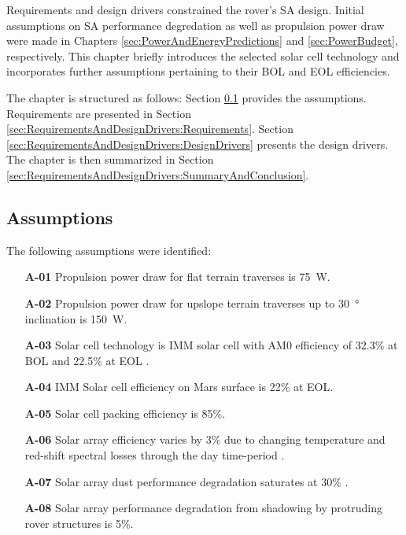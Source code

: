 Requirements and design drivers constrained the rover's \ac{SA} design. Initial assumptions on \ac{SA} performance degredation as well as propulsion power draw were made in Chapters \ref{sec:PowerAndEnergyPredictions} and \ref{sec:PowerBudget}, respectively. This chapter briefly introduces the selected solar cell technology and incorporates further assumptions pertaining to their \ac{BOL} and \ac{EOL} efficiencies.

The chapter is structured as follows: Section \ref{sec:RequirementsAndDesignDrivers:Assumptions} provides the assumptions. Requirements are presented in Section \ref{sec:RequirementsAndDesignDrivers:Requirements}. Section  \ref{sec:RequirementsAndDesignDrivers:DesignDrivers} presents the design drivers. The chapter is then summarized in Section \ref{sec:RequirementsAndDesignDrivers:SummaryAndConclusion}.


\subsection{Assumptions}
\label{sec:RequirementsAndDesignDrivers:Assumptions}
The following assumptions were identified:

\begin{itemize}
    \item[\textbf{A-01}] Propulsion power draw for flat terrain traverses is \SI{75}{\watt}.
    \item[\textbf{A-02}] Propulsion power draw for upslope terrain traverses up to \SI{30}{\degree} inclination is \SI{150}{\watt}.
    \item[\textbf{A-03}] Solar cell technology is \ac{IMM} solar cell with AM0 efficiency of 32.3\% at \ac{BOL} and 22.5\% at \ac{EOL} .
    \item[\textbf{A-04}] IMM Solar cell efficiency on Mars surface is 22\% at \ac{EOL}.
    \item[\textbf{A-05}] Solar cell packing efficiency is 85\%.
    \item[\textbf{A-06}] Solar array efficiency varies by 3\% due to changing temperature and red-shift spectral losses through the day time-period .
    \item[\textbf{A-07}] Solar array dust performance degradation saturates at 30\% .
    \item[\textbf{A-08}] Solar array performance degradation from shadowing by protruding rover structures is 5\%.
\end{itemize}

